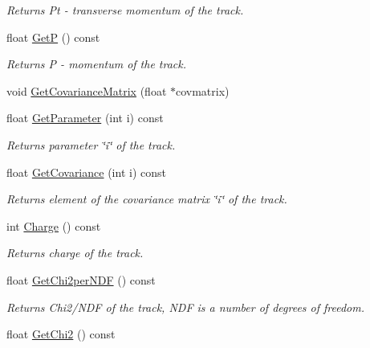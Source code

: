 \begin{DoxyCompactItemize}
\begin{DoxyCompactList}\small\item\em Returns Pt -\/ transverse momentum of the track. \end{DoxyCompactList}\item 
float \hyperlink{classKFPTrack_a0118d414f37afc4773db82ce6c70c9b0}{GetP} () const \hypertarget{classKFPTrack_a0118d414f37afc4773db82ce6c70c9b0}{}\label{classKFPTrack_a0118d414f37afc4773db82ce6c70c9b0}

\begin{DoxyCompactList}\small\item\em Returns P -\/ momentum of the track. \end{DoxyCompactList}\item 
void \hyperlink{classKFPTrack_a4cb9baefe05535b9d47a5267e47774b2}{Get\+Covariance\+Matrix} (float $\ast$covmatrix)
\item 
float \hyperlink{classKFPTrack_a26a2c40f1816f0d071b7fee5bab617eb}{Get\+Parameter} (int i) const 
\begin{DoxyCompactList}\small\item\em Returns parameter \char`\"{}i\char`\"{} of the track. \end{DoxyCompactList}\item 
float \hyperlink{classKFPTrack_a7c63b7a88111433c719b96d5ca7c4951}{Get\+Covariance} (int i) const 
\begin{DoxyCompactList}\small\item\em Returns element of the covariance matrix \char`\"{}i\char`\"{} of the track. \end{DoxyCompactList}\item 
int \hyperlink{classKFPTrack_a4080eeb7c9d6327f8262dd3635b98a85}{Charge} () const \hypertarget{classKFPTrack_a4080eeb7c9d6327f8262dd3635b98a85}{}\label{classKFPTrack_a4080eeb7c9d6327f8262dd3635b98a85}

\begin{DoxyCompactList}\small\item\em Returns charge of the track. \end{DoxyCompactList}\item 
float \hyperlink{classKFPTrack_ac182c19b8070a08d1592f8f40907df7a}{Get\+Chi2per\+N\+DF} () const \hypertarget{classKFPTrack_ac182c19b8070a08d1592f8f40907df7a}{}\label{classKFPTrack_ac182c19b8070a08d1592f8f40907df7a}

\begin{DoxyCompactList}\small\item\em Returns Chi2/\+N\+DF of the track, N\+DF is a number of degrees of freedom. \end{DoxyCompactList}\item 
float \hyperlink{classKFPTrack_a6d3642d6ac5b7eddf9b673f94fea8d2c}{Get\+Chi2} () const \hypertarget{classKFPTrack_a6d3642d6ac5b7eddf9b673f94fea8d2c}{}\label{classKFPTrack_a6d3642d6ac5b7eddf9b673f94fea8d2c}


\end{DoxyCompactItemize}
